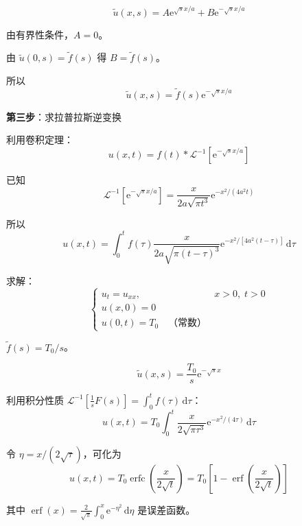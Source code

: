 \begin{equation}
    \tilde{u}(x, s) = A\mathrm{e}^{\sqrt{s}x/a} + B\mathrm{e}^{-\sqrt{s}x/a}
\end{equation}

由有界性条件，$A = 0$。

由 $\tilde{u}(0, s) = \tilde{f}(s)$ 得 $B = \tilde{f}(s)$。

所以
\begin{equation}
    \tilde{u}(x, s) = \tilde{f}(s)\mathrm{e}^{-\sqrt{s}x/a}
\end{equation}

\textbf{第三步}：求拉普拉斯逆变换

利用卷积定理：
\begin{equation}
    u(x, t) = f(t) * \mathcal{L}^{-1}[\mathrm{e}^{-\sqrt{s}x/a}]
\end{equation}

已知
\begin{equation}
    \mathcal{L}^{-1}[\mathrm{e}^{-\sqrt{s}x/a}] = \frac{x}{2a\sqrt{\pi t^3}}\mathrm{e}^{-x^2/(4a^2t)}
\end{equation}

所以
\begin{equation}
    \boxed{u(x, t) = \int_0^t f(\tau)\frac{x}{2a\sqrt{\pi(t-\tau)^3}}\mathrm{e}^{-x^2/[4a^2(t-\tau)]}\,\mathrm{d}\tau}
\end{equation}

\begin{lizi}{}{}
求解：
\begin{equation}
    \begin{cases}
        u_t = u_{xx}, & x > 0, \; t > 0 \\
        u(x, 0) = 0 \\
        u(0, t) = T_0 \quad \text{（常数）}
    \end{cases}
\end{equation}

\begin{jie}
    $\tilde{f}(s) = T_0/s$。
    
    \begin{equation}
        \tilde{u}(x, s) = \frac{T_0}{s}\mathrm{e}^{-\sqrt{s}x}
    \end{equation}
    
    利用积分性质 $\mathcal{L}^{-1}[\frac{1}{s}F(s)] = \int_0^t f(\tau)\,\mathrm{d}\tau$：
    \begin{equation}
        u(x, t) = T_0\int_0^t \frac{x}{2\sqrt{\pi\tau^3}}\mathrm{e}^{-x^2/(4\tau)}\,\mathrm{d}\tau
    \end{equation}
    
    令 $\eta = x/(2\sqrt{\tau})$，可化为
    \begin{equation}
        u(x, t) = T_0\operatorname{erfc}\left(\frac{x}{2\sqrt{t}}\right) = T_0\left[1 - \operatorname{erf}\left(\frac{x}{2\sqrt{t}}\right)\right]
    \end{equation}
    
    其中 $\operatorname{erf}(x) = \frac{2}{\sqrt{\pi}}\int_0^x \mathrm{e}^{-\eta^2}\,\mathrm{d}\eta$ 是误差函数。
\end{jie}
\end{lizi}

